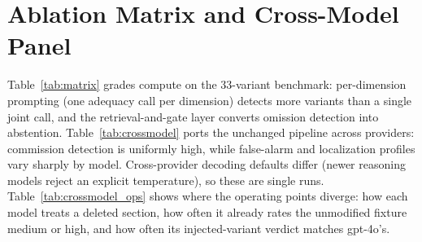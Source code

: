 \begin{table}[t]
  \centering\small
  \caption{Each injected flaw, its target dimension, and its methodological
  basis in the literature; the reporting requirement the flaw violates is the
  rubric's operationalization.}
  \label{tab:flawlit}
  \setlength{\tabcolsep}{4pt}
\end{table}

\section{Ablation Matrix and Cross-Model Panel}
\label{app:matrix}

Table~\ref{tab:matrix} grades compute on the 33-variant benchmark:
per-dimension prompting (one adequacy call per dimension) detects more variants
than a single joint call, and the retrieval-and-gate layer converts omission
detection into abstention.
Table~\ref{tab:crossmodel} ports the unchanged pipeline across providers:
commission detection is uniformly high, while false-alarm and localization
profiles vary sharply by model. Cross-provider decoding defaults differ (newer
reasoning models reject an explicit temperature), so these are single runs.
Table~\ref{tab:crossmodel_ops} shows where the operating points diverge: how
each model treats a deleted section, how often it already rates the unmodified
fixture medium or high, and how often its injected-variant verdict matches
gpt-4o's.

